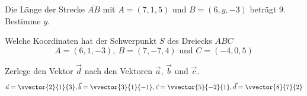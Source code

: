 \documentclass[12pt]{exam}
\begin{document}
\begin{questions}
\question[4]
\vspace{5pt}
\vspace{5pt}


\newpage
\question[4]
Die Länge der Strecke $\overline{AB}$ mit $A=(7,1,5)$ und $B=(6,y,-3)$ beträgt $9$. Bestimme $y$.
\vspace{5pt}

\newpage
\question[4]
Welche Koordinaten hat der Schwerpunkt $S$ des Dreiecks $ABC$
\[A=(6,1,-3),\:B=(7,-7,4) \text{ und } C=(-4,0,5)\] 
\vspace{5pt}

\newpage
\question[6]
Zerlege den Vektor $\vec{d}$ nach den Vektoren $\vec{a}$, $\vec{b}$ und $\vec{c}$. \[ \vec{a} = \vvector{2}{1}{3}, \vec{b} = \vvector{3}{1}{-1}, \vec{c} = \vvector{5}{-2}{1}, \vec{d} = \vvector{8}{7}{2} \]
\vspace{5pt}

\newpage
\question[3]
\vspace{5pt}
\begin{parts}
\setcounter{partno}{1}

\end{parts}
\end{questions}
\end{document}
